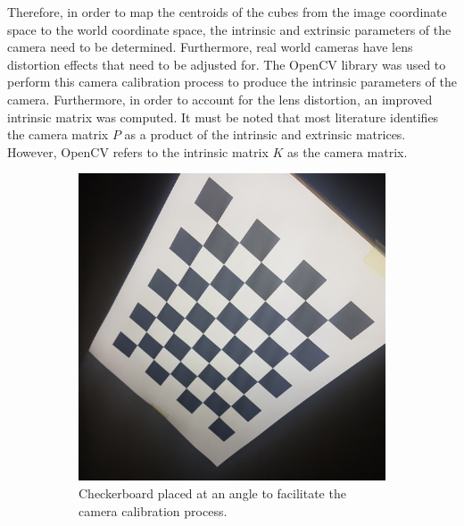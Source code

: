 Therefore, in order to map the centroids of the cubes from the image coordinate space to the world coordinate space, the intrinsic and extrinsic parameters of the camera need to be determined. Furthermore, real world cameras have lens distortion effects that need to be adjusted for. The OpenCV library was used to perform this camera calibration process to produce the intrinsic parameters of the camera. Furthermore, in order to account for the lens distortion, an improved intrinsic matrix was computed. It must be noted that most literature identifies the camera matrix $P$ as a product of the intrinsic and extrinsic matrices. However, OpenCV refers to the intrinsic matrix $K$ as the camera matrix. 

\begin{figure}[H]
    \centering
    \begin{subfigure}[b]{0.45\textwidth}
         \includegraphics[width=\textwidth]{figures/202106/original-checkerboard.jpg}
         \caption{Checkerboard placed at an angle to facilitate the camera calibration process.}
         \label{fig:original-checkerboard}
    \end{subfigure}
    \begin{subfigure}[b]{0.45\textwidth}

\end{subfigure}
\end{figure}
